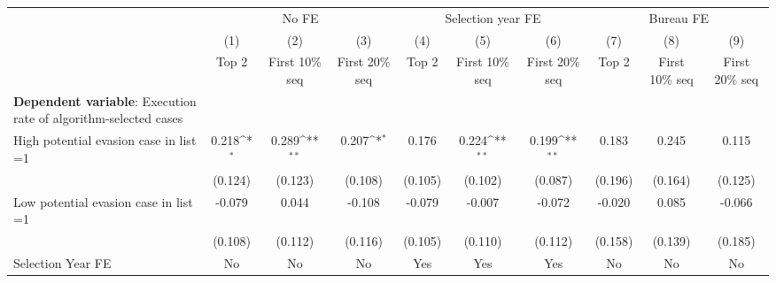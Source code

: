 {
\def\sym#1{\ifmmode^{#1}\else\(^{#1}\)\fi}
\begin{tabular}{l*{9}{c}}
\toprule
            &\multicolumn{3}{c}{No FE}                                        &\multicolumn{3}{c}{Selection year FE}                            &\multicolumn{3}{c}{Bureau FE}                                    \\\cmidrule(lr){2-4}\cmidrule(lr){5-7}\cmidrule(lr){8-10}
            &\multicolumn{1}{c}{(1)}&\multicolumn{1}{c}{(2)}&\multicolumn{1}{c}{(3)}&\multicolumn{1}{c}{(4)}&\multicolumn{1}{c}{(5)}&\multicolumn{1}{c}{(6)}&\multicolumn{1}{c}{(7)}&\multicolumn{1}{c}{(8)}&\multicolumn{1}{c}{(9)}\\
            &\multicolumn{1}{c}{Top 2}&\multicolumn{1}{c}{First 10\% seq}&\multicolumn{1}{c}{First 20\% seq}&\multicolumn{1}{c}{Top 2}&\multicolumn{1}{c}{First 10\% seq}&\multicolumn{1}{c}{First 20\% seq}&\multicolumn{1}{c}{Top 2}&\multicolumn{1}{c}{First 10\% seq}&\multicolumn{1}{c}{First 20\% seq}\\
\midrule
\textbf{Dependent variable}: Execution rate of algorithm-selected cases&                     &                     &                     &                     &                     &                     &                     &                     &                     \\
\addlinespace
High potential evasion case in list =1&       0.218\sym{*}  &       0.289\sym{**} &       0.207\sym{*}  &       0.176         &       0.224\sym{**} &       0.199\sym{**} &       0.183         &       0.245         &       0.115         \\
            &     (0.124)         &     (0.123)         &     (0.108)         &     (0.105)         &     (0.102)         &     (0.087)         &     (0.196)         &     (0.164)         &     (0.125)         \\
\addlinespace
Low potential evasion case in list =1&      -0.079         &       0.044         &      -0.108         &      -0.079         &      -0.007         &      -0.072         &      -0.020         &       0.085         &      -0.066         \\
            &     (0.108)         &     (0.112)         &     (0.116)         &     (0.105)         &     (0.110)         &     (0.112)         &     (0.158)         &     (0.139)         &     (0.185)         \\
\midrule
Selection Year FE&          No         &          No         &          No         &         Yes         &         Yes         &         Yes         &          No         &          No         &          No         \\

\end{tabular}}
